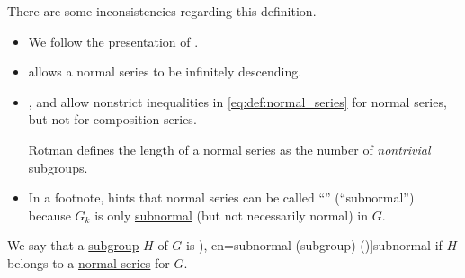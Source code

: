 \begin{comments}
  \item There are some inconsistencies regarding this definition.
  \begin{itemize}
    \item We follow the presentation of \textcite[96]{Курош1967ТеорияГрупп}.
    \item \Textcite[205]{Aluffi2009Algebra} allows a normal series to be infinitely descending.
    \item \Textcite[244]{Jacobson1985BasicAlgebraI}, \textcite[192]{Rotman2015AdvancedModernAlgebraPart1} and \textcite[173]{Knapp2016BasicAlgebra} allow nonstrict inequalities in \eqref{eq:def:normal_series} for normal series, but not for composition series.

    Rotman defines the length of a normal series as the number of \emph{nontrivial} subgroups.

    \item In a footnote, \textcite[193]{Rotman2015AdvancedModernAlgebraPart1} hints that normal series can be called \enquote{} (\enquote{subnormal}) because \( G_k \) is only \hyperref[def:subnormal_group]{subnormal} (but not necessarily normal) in \( G \).
  \end{itemize}
\end{comments}

\begin{definition}\label{def:subnormal_group}
  We say that a \hyperref[def:group/subobject]{subgroup} \( H \) of \( G \) is \term[ru=достижимая (подгруппа); субнормальная (подгруппа) (\cite[439]{Курош1967ТеорияГрупп}), en=subnormal (subgroup) (\cite[192]{Rotman2015AdvancedModernAlgebraPart1})]{subnormal} if \( H \) belongs to a \hyperref[def:normal_series]{normal series} for \( G \).
\end{definition}


